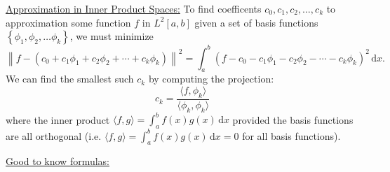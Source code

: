 \documentclass{exam}
\newcommand{\braces}[1]{\ensuremath{\left\{#1 \right\}}}
\begin{document}
    \underline{Approximation in Inner Product Spaces:} To find coefficents $c_0, c_1, c_2, \ldots, c_k$ to approximation some function $f$ in $L^{2}[a, b]$ given a set of basis functions $\braces{\phi_1, \phi_2, \ldots \phi_k}$, we must minimize 
    \[
        \left\|f - (c_0 + c_1\phi_1 + c_2\phi_2 + \cdots + c_k\phi_k)\right\|^2 = \int_{a}^{b} (f - c_0 - c_1\phi_1 - c_2\phi_2 - \cdots - c_k\phi_k)^2\,\mathrm{d}x.
    \]
    We can find the smallest such $c_k$ by computing the projection: 
    \[
        c_k = \frac{\langle f, \phi_k\rangle}{\langle \phi_k, \phi_k \rangle} 
    \]
    where the inner product $\langle f, g \rangle = \int_{a}^{b} f(x)g(x)\,\mathrm{d}x$ provided the basis functions are all orthogonal (i.e. $\langle f, g \rangle = \int_{a}^{b} f(x)g(x)\,\mathrm{d}x = 0$ for all basis functions).
    
    \underline{Good to know formulas:}
\end{document}
